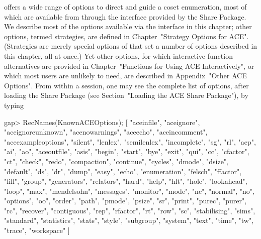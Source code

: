

{\ACE} offers a wide range of options to  direct  and  guide  a  coset
enumeration, most of which  are  available  from  {\GAP}  through  the
interface provided by the {\ACE} Share Package. We  describe  most  of
the options  available  via  the  interface  in  this  chapter;  other
options, termed strategies, are defined in  Chapter~"Strategy  Options
for ACE". (Strategies are merely special options of {\ACE} that set  a
number of options described in this chapter, all at once.)  Yet  other
options, for which interactive function alternatives are  provided  in
Chapter~"Functions for Using ACE Interactively", or which most  {\GAP}
users are unlikely to  need,  are  described  in  Appendix~"Other  ACE
Options". From within a {\GAP} session, one may see the complete  list
of {\ACE}  options,  after  loading  the  {\ACE}  Share  Package  (see
Section~"Loading the ACE Share Package"), by typing

\beginexample
gap> RecNames(KnownACEOptions);
[ "aceinfile", "aceignore", "aceignoreunknown", "acenowarnings", "aceecho", 
  "aceincomment", "aceexampleoptions", "silent", "lenlex", "semilenlex", 
  "incomplete", "sg", "rl", "aep", "ai", "ao", "aceoutfile", "asis", "begin", 
  "start", "bye", "exit", "qui", "cc", "cfactor", "ct", "check", "redo", 
  "compaction", "continue", "cycles", "dmode", "dsize", "default", "ds", 
  "dr", "dump", "easy", "echo", "enumeration", "felsch", "ffactor", "fill", 
  "group", "generators", "relators", "hard", "help", "hlt", "hole", 
  "lookahead", "loop", "max", "mendelsohn", "messages", "monitor", "mode", 
  "nc", "normal", "no", "options", "oo", "order", "path", "pmode", "psize", 
  "sr", "print", "purec", "purer", "rc", "recover", "contiguous", "rep", 
  "rfactor", "rt", "row", "sc", "stabilising", "sims", "standard", 
  "statistics", "stats", "style", "subgroup", "system", "text", "time", "tw", 
  "trace", "workspace" ]
\endexample

